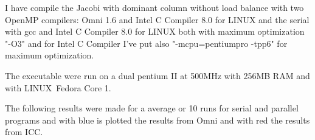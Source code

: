 \documentclass[a4paper]{article}
\begin{document}
I have compile the Jacobi with dominant column without load balance with two
OpenMP compilers: Omni 1.6 and Intel C Compiler 8.0 for LINUX and the serial
with gcc and Intel C Compiler 8.0 for LINUX both with maximum optimization
"-O3" and for Intel C Compiler I've put also "-mcpu=pentiumpro -tpp6" for
maximum optimization.

The executable were run on a dual pentium II at 500MHz with 256MB RAM and
with LINUX\ Fedora Core 1.

The following results were made for a average or 10 runs for serial and
parallel programs and with blue is plotted the results from Omni and with
red the results from ICC.

\begin{center}
\end{center}
\end{document}
